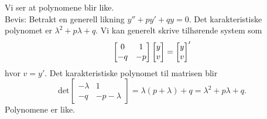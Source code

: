 \begin{losning}
Vi ser at polynomene blir like.
\\

Bevis: Betrakt en generell likning $y''+py'+qy=0$. Det karakteristiske polynomet er $\lambda ^2+p\lambda+q$. Vi kan generelt skrive tilhørende system som $$\begin{bmatrix}
0 & 1\\
-q & -p
\end{bmatrix} \begin{bmatrix} y \\ v \end{bmatrix}=\begin{bmatrix} y \\ v \end{bmatrix} '
$$ hvor $v=y'$. Det karakteristiske polynomet til matrisen blir $$
\text{det}\begin{bmatrix}
-\lambda & 1\\
-q & -p-\lambda
\end{bmatrix}=\lambda(p+\lambda)+q=\lambda^2+p\lambda+q.
$$Polynomene er like.
\end{losning}

